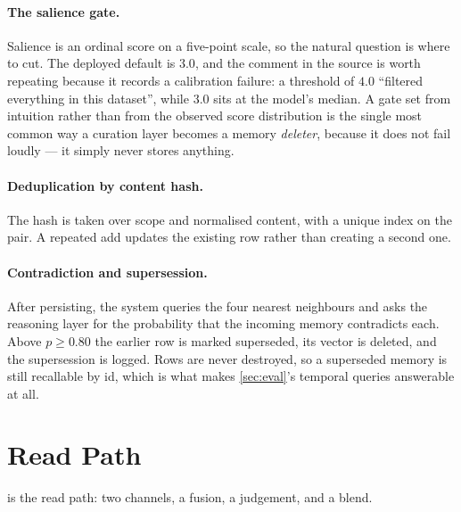 \documentclass[10pt,twocolumn]{article}
\begin{document}
\paragraph{The salience gate.}
Salience is an ordinal score on a five-point scale, so the natural question is
where to cut. The deployed default is $3.0$, and the comment in the source is
worth repeating because it records a calibration failure: a threshold of $4.0$
``filtered everything in this dataset'', while $3.0$ sits at the model's median.
A gate set from intuition rather than from the observed score distribution is
the single most common way a curation layer becomes a memory \emph{deleter},
because it does not fail loudly --- it simply never stores anything.

\paragraph{Deduplication by content hash.}
The hash is taken over scope and normalised content, with a unique index on the
pair. A repeated add updates the existing row rather than creating a second one.

\paragraph{Contradiction and supersession.}
After persisting, the system queries the four nearest neighbours and asks the
reasoning layer for the probability that the incoming memory contradicts each.
Above $p\geq0.80$ the earlier row is marked superseded, its vector is deleted,
and the supersession is logged. Rows are never destroyed, so a superseded
memory is still recallable by id, which is what makes \cref{sec:eval}'s temporal
queries answerable at all.

\section{Read Path}
\label{sec:read}

 is the read path: two channels, a fusion, a judgement, and a
blend.
\end{document}
